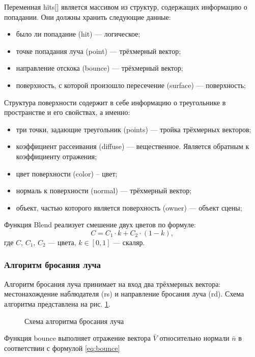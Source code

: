 Переменная hits[] является массивом из структур, содержащих информацию о попадании. Они должны хранить следующие данные:
\begin{itemize}
	\item было ли попадание (hit) --- логическое;
	\item точке попадания луча (point) --- трёхмерный вектор;
	\item направление отскока (bounce) --- трёхмерный вектор;
	\item поверхность, с которой произошло пересечение (surface) --- поверхность;
\end{itemize}

Структура поверхности содержит в себе информацию о треугольнике в пространстве и его свойствах, а именно:
\begin{itemize}
	\item три точки, задающие треугольник (points) --- тройка трёхмерных векторов;
	\item коэффициент рассеивания (diffuse) --- вещественное. Является обратным к коэффициенту отражения;
	\item цвет поверхности (color) – цвет;
	\item нормаль к поверхности (normal) --- трёхмерный вектор;
	\item объект, частью которого является поверхность (owner) --- объект сцены;
\end{itemize}

Функция Blend реализует смешение двух цветов по формуле:
\begin{equation}
	C = C_1\cdot k+C_2\cdot(1-k),
\end{equation}
где $C$, $C_1$, $C_2$ --- цвета, $k\in[0, 1]$ --- скаляр.

\subsubsection{Алгоритм бросания луча}
Алгоритм бросания луча принимает на вход два трёхмерных вектора: местонахождение наблюдателя (rs) и направление бросания луча (rd). Схема алгоритма представлена на рис. \ref{fig:throw_ray}.

\begin{figure}[!ht]
	\caption{Схема алгоритма бросания луча}
	\label{fig:throw_ray}
\end{figure}

Функция bounce выполняет отражение вектора $\bar V$ относительно нормали $\bar n$ в соответствии с формулой \ref{eq:bounce}

